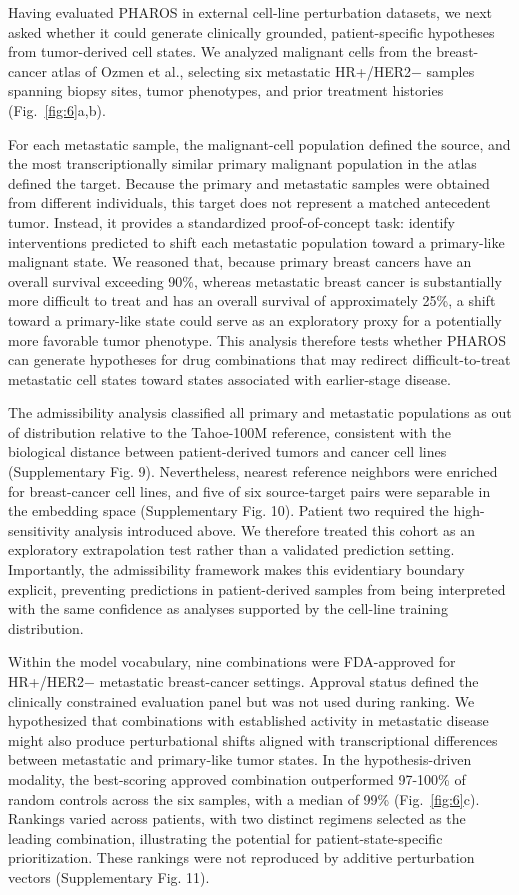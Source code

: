 \documentclass[11pt,a4paper]{article}
\begin{document}
Having evaluated PHAROS in external cell-line perturbation datasets, we next asked whether it could generate clinically grounded, patient-specific hypotheses from tumor-derived cell states. We analyzed malignant cells from the breast-cancer atlas of Ozmen et al.\cite{Ozmen2025}, selecting six metastatic HR+/HER2$-$ samples spanning biopsy sites, tumor phenotypes, and prior treatment histories (Fig.~\ref{fig:6}a,b).

For each metastatic sample, the malignant-cell population defined the source, and the most transcriptionally similar primary malignant population in the atlas defined the target. Because the primary and metastatic samples were obtained from different individuals, this target does not represent a matched antecedent tumor. Instead, it provides a standardized proof-of-concept task: identify interventions predicted to shift each metastatic population toward a primary-like malignant state. We reasoned that, because primary breast cancers have an overall survival exceeding 90\%, whereas metastatic breast cancer is substantially more difficult to treat and has an overall survival of approximately 25\%, a shift toward a primary-like state could serve as an exploratory proxy for a potentially more favorable tumor phenotype\cite{Allemani2018, Valastyan2011}. This analysis therefore tests whether PHAROS can generate hypotheses for drug combinations that may redirect difficult-to-treat metastatic cell states toward states associated with earlier-stage disease. 

The admissibility analysis classified all primary and metastatic populations as out of distribution relative to the Tahoe-100M reference, consistent with the biological distance between patient-derived tumors and cancer cell lines (Supplementary Fig. 9). Nevertheless, nearest reference neighbors were enriched for breast-cancer cell lines, and five of six source-target pairs were separable in the embedding space (Supplementary Fig. 10). Patient two required the high-sensitivity analysis introduced above. We therefore treated this cohort as an exploratory extrapolation test rather than a validated prediction setting. Importantly, the admissibility framework makes this evidentiary boundary explicit, preventing predictions in patient-derived samples from being interpreted with the same confidence as analyses supported by the cell-line training distribution.

Within the model vocabulary, nine combinations were FDA-approved for HR+/HER2$-$ metastatic breast-cancer settings. Approval status defined the clinically constrained evaluation panel but was not used during ranking. We hypothesized that combinations with established activity in metastatic disease might also produce perturbational shifts aligned with transcriptional differences between metastatic and primary-like tumor states. In the hypothesis-driven modality, the best-scoring approved combination outperformed 97-100\% of random controls across the six samples, with a median of 99\% (Fig.~\ref{fig:6}c). Rankings varied across patients, with two distinct regimens selected as the leading combination, illustrating the potential for patient-state-specific prioritization. These rankings were not reproduced by additive perturbation vectors (Supplementary Fig. 11).
\end{document}
